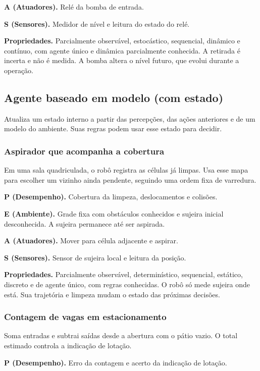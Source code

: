 \documentclass[12pt,a4paper]{article}
\begin{document}
\textbf{A (Atuadores).} Relé da bomba de entrada.

\textbf{S (Sensores).} Medidor de nível e leitura do estado do relé.

\textbf{Propriedades.} Parcialmente observável, estocástico, sequencial, dinâmico e contínuo, com agente único e dinâmica parcialmente conhecida. A retirada é incerta e não é medida. A bomba altera o nível futuro, que evolui durante a operação.

\subsection{Agente baseado em modelo (com estado)}

Atualiza um estado interno a partir das percepções, das ações anteriores e de um modelo do ambiente. Suas regras podem usar esse estado para decidir.

\subsubsection{Aspirador que acompanha a cobertura}

Em uma sala quadriculada, o robô registra as células já limpas. Usa esse mapa para escolher um vizinho ainda pendente, seguindo uma ordem fixa de varredura.

\textbf{P (Desempenho).} Cobertura da limpeza, deslocamentos e colisões.

\textbf{E (Ambiente).} Grade fixa com obstáculos conhecidos e sujeira inicial desconhecida. A sujeira permanece até ser aspirada.

\textbf{A (Atuadores).} Mover para célula adjacente e aspirar.

\textbf{S (Sensores).} Sensor de sujeira local e leitura da posição.

\textbf{Propriedades.} Parcialmente observável, determinístico, sequencial, estático, discreto e de agente único, com regras conhecidas. O robô só mede sujeira onde está. Sua trajetória e limpeza mudam o estado das próximas decisões.

\subsubsection{Contagem de vagas em estacionamento}

Soma entradas e subtrai saídas desde a abertura com o pátio vazio. O total estimado controla a indicação de lotação.

\textbf{P (Desempenho).} Erro da contagem e acerto da indicação de lotação.
\end{document}
